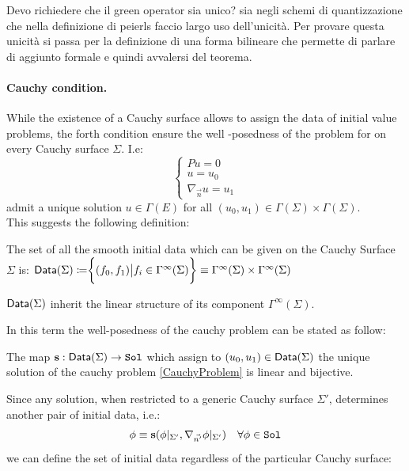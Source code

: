 \documentclass[Main]{subfiles}
\begin{document}
			\danger
			Devo richiedere che il green operator sia unico? sia negli schemi di quantizzazione che nella definizione di peierls faccio largo uso dell'unicità. 
			Per provare questa unicità si passa per la definizione di una forma bilineare che permette di parlare di aggiunto formale e quindi avvalersi del teorema.
			

		\paragraph{Cauchy condition.}
			While the existence of a Cauchy surface allows to assign the data of initial value problems, the forth condition ensure the well -posedness of the problem for on every Cauchy surface $\Sigma$. I.e:
			\begin{equation}\label{CauchyProblem}
				\begin{cases} P u = 0 \\ u = u_0 \\ \nabla_{\vec{n}}u= u_1 \end{cases}
			\end{equation}
			admit a unique solution $u\in \Gamma(E)$ for all $(u_0, u_1) \in \Gamma (\Sigma )\times \Gamma (\Sigma )$.
			\\
			This suggests the following definition:
			\begin{notationfix}
				The set of all the smooth initial data which can be given on the Cauchy Surface $\Sigma$ is:
				$\mathsf{Data}(\Sigma)  \coloneqq \biggr \{ (f_0,f_1) \big \vert f_i \in \Gamma^\infty(\Sigma)\biggr\}  \equiv  \Gamma^\infty(\Sigma) \times \Gamma^\infty(\Sigma)$
			\end{notationfix}
			\begin{observation}
				$\mathsf{Data}(\Sigma)$ inherit the linear structure of its component $ \Gamma^\infty(\Sigma)$.
			\end{observation}	
			In this term the well-posedness of the cauchy problem can be stated as follow:

			\begin{proposition}
				The map $ 	 \mathbf{s} : \mathsf{Data} (\Sigma ) \rightarrow \mathtt{Sol} $ which assign to $(u_0, u_1)\in \mathsf{Data}(\Sigma)$ the unique solution of the cauchy problem \ref{CauchyProblem} is linear and bijective.
			\end{proposition}
			
			Since any solution, when restricted to a generic Cauchy surface $\Sigma'$, determines another pair of initial data, i.e.:
			\begin{displaymath}
				\phi \equiv \mathbf{s} (\phi \vert_{\Sigma'}, \nabla_{\vec{n'}}\phi	 \vert_{\Sigma'} )	\quad \forall \phi\in \mathtt{Sol}
			\end{displaymath}						
			we can define the set of initial data regardless of the particular Cauchy surface:			
			
\end{document}
